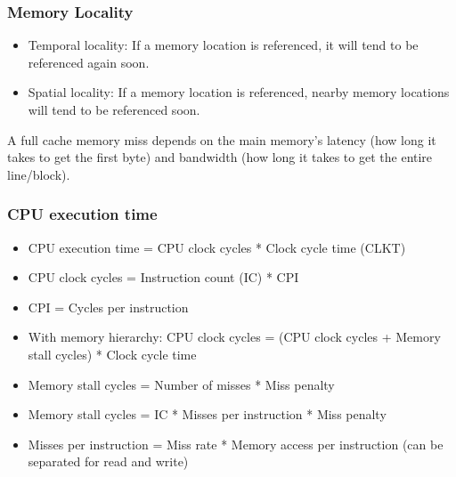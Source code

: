 \begin{frame}
    \frametitle{Memory Locality}
    \begin{itemize}
        \item Temporal locality: If a memory location is referenced, it will tend to be referenced again soon.
        \item Spatial locality: If a memory location is referenced, nearby memory locations will tend to be referenced soon.
    \end{itemize}
    A full cache memory miss depends on the main memory's latency (how long it takes to get the first byte) and bandwidth (how long it takes to get the entire line/block).
\end{frame}

\begin{frame}
    \frametitle{CPU execution time}
    \begin{itemize}
        \item CPU execution time = CPU clock cycles * Clock cycle time (CLKT)
        \item CPU clock cycles = Instruction count (IC) * CPI
        \item CPI = Cycles per instruction
        \item With memory hierarchy: CPU clock cycles = (CPU clock cycles + Memory stall cycles) * Clock cycle time
        \item Memory stall cycles = Number of misses * Miss penalty
        \item Memory stall cycles = IC * Misses per instruction * Miss penalty
        \item Misses per instruction = Miss rate * Memory access per instruction (can be separated for read and write)
    \end{itemize}
\end{frame}